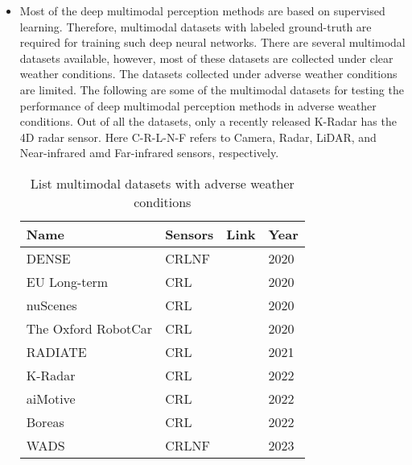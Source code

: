 \documentclass[rnd]{mas_proposal}
\begin{document}
\begin{itemize}
    \item Most of the deep multimodal perception methods are based on supervised learning. Therefore, multimodal datasets with labeled ground-truth are required for training such deep neural networks. There are several multimodal datasets available, however, most of these datasets are collected under clear weather conditions. The datasets collected under adverse weather conditions are limited. The following are some of the multimodal datasets for testing the performance of deep multimodal perception methods in adverse weather conditions. Out of all the datasets, only a recently released K-Radar \cite{Paek2022Jun} has the 4D radar sensor. Here C-R-L-N-F refers to Camera, Radar, LiDAR, and Near-infrared amd Far-infrared sensors, respectively.


          \begin{table}[h]
              \centering
              \caption{List multimodal datasets with adverse weather conditions}
              \label{tab:my-table}
              \begin{tabular}{|l|l|l|l|}
                  \hline
                  \textbf{Name}       & \textbf{Sensors} & \textbf{Link}               & \textbf{Year} \\ \hline
                  DENSE               & CRLNF            & \cite{bijelic2020seeing}    & 2020          \\ \hline
                  EU Long-term        & CRL              & \cite{yan2020eu}            & 2020          \\ \hline
                  nuScenes            & CRL              & \cite{caesar2020nuscenes}   & 2020          \\ \hline
                  The Oxford RobotCar & CRL              & \cite{barnes2020oxford}     & 2020          \\ \hline
                  RADIATE             & CRL              & \cite{sheeny2021radiate}    & 2021          \\ \hline
                  K-Radar             & CRL              & \cite{Paek2022Jun}            & 2022          \\ \hline
                  aiMotive            & CRL              & \cite{matuszka2022aimotive} & 2022          \\ \hline
                  Boreas              & CRL              & \cite{burnett2022boreas}    & 2022          \\ \hline
                  WADS                & CRLNF            & \cite{kurup2022winter}      & 2023          \\ \hline
              \end{tabular}
          \end{table}


\end{itemize}
\end{document}
